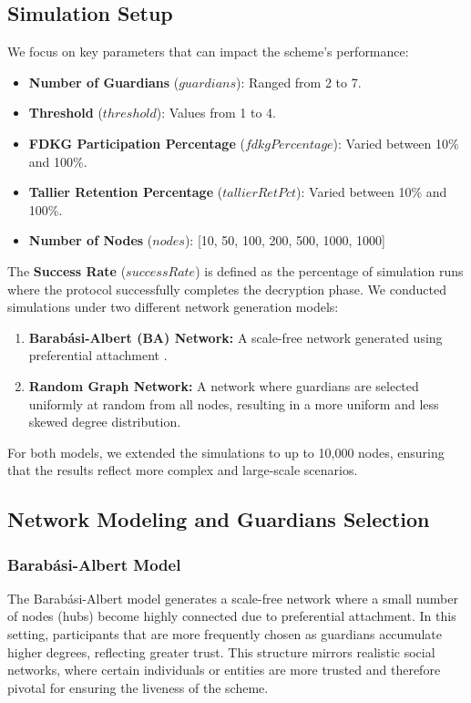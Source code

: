 \documentclass[runningheads]{llncs}
\begin{document}
\subsection{Simulation Setup}

We focus on key parameters that can impact the scheme's performance:

\begin{itemize}
    \item \textbf{Number of Guardians} ($guardians$): Ranged from 2 to 7.
    \item \textbf{Threshold} ($threshold$): Values from 1 to 4.
    \item \textbf{FDKG Participation Percentage} ($fdkgPercentage$): Varied between 10\% and 100\%.
    \item \textbf{Tallier Retention Percentage} ($tallierRetPct$): Varied between 10\% and 100\%.
    \item \textbf{Number of Nodes} ($nodes$): [10, 50, 100, 200, 500, 1000, 1000]
\end{itemize}

The \textbf{Success Rate} ($successRate$) is defined as the percentage of simulation runs where the protocol successfully completes the decryption phase. We conducted simulations under two different network generation models:

\begin{enumerate}
    \item \textbf{Barabási-Albert (BA) Network:} A scale-free network generated using preferential attachment \cite{barabasi1999emergence}.
    \item \textbf{Random Graph Network:} A network where guardians are selected uniformly at random from all nodes, resulting in a more uniform and less skewed degree distribution.
\end{enumerate}

For both models, we extended the simulations to up to 10,000 nodes, ensuring that the results reflect more complex and large-scale scenarios.

\subsection{Network Modeling and Guardians Selection}

\subsubsection{Barabási-Albert Model}
The Barabási-Albert model generates a scale-free network where a small number of nodes (hubs) become highly connected due to preferential attachment. In this setting, participants that are more frequently chosen as guardians accumulate higher degrees, reflecting greater trust. This structure mirrors realistic social networks, where certain individuals or entities are more trusted and therefore pivotal for ensuring the liveness of the scheme.
\end{document}
